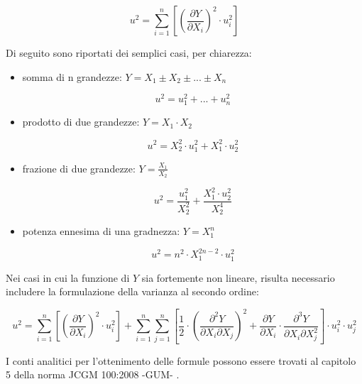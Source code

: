 \documentclass[a4paper, twoside]{article}
\begin{document}
\begin{equation}
    u^2 = \sum_{i=1}^{n} \left[ \left( \frac{\partial Y}{\partial X_i} \right)^2 \cdot u_i^2 \right]
\end{equation}

Di seguito sono riportati dei semplici casi, per chiarezza:

\begin{itemize}
    \item somma di n grandezze: $Y=X_1 \pm X_2 \pm ... \pm X_n$
     
        \begin{equation}
            u^2=u_1^2+...+u_n^2
        \end{equation}

    \item prodotto di due grandezze: $Y=X_1 \cdot X_2$
    
        \begin{equation}
            u^2=X_2^2 \cdot u_1^2+X_1^2 \cdot u_2^2
        \end{equation}

    \item frazione di due grandezze: $Y=\frac{X_1}{X_2}$
    
        \begin{equation}
            u^2=\frac{u_1^2}{X_2^2}+\frac{X_1^2 \cdot u_2^2}{X_2^4}
        \end{equation}

    \item potenza ennesima di una gradnezza: $Y=X_1^n$
    
        \begin{equation}
            u^2=n^2 \cdot X_1^{2n-2} \cdot u_1^2
        \end{equation}
\end{itemize}

Nei casi in cui la funzione di $Y$ sia fortemente non lineare, risulta necessario includere la formulazione della varianza al secondo ordine:

\begin{equation}
    u^2=\sum_{i=1}^{n} \left[ \left( \frac{\partial Y}{\partial X_i} \right)^2 \cdot u_i^2 \right]+\sum_{i=1}^{n} \sum_{j=1}^{n} \left[ \frac{1}{2} \cdot \left( \frac{\partial^2 Y}{\partial X_i \partial X_j} \right)^2 + \frac{\partial Y}{\partial X_i} \cdot \frac{\partial^3 Y}{\partial X_i \partial X_j^2} \right] \cdot u^2_i \cdot u^2_j
\end{equation}

I conti analitici per l'ottenimento delle formule
possono essere trovati al capitolo 5 della norma JCGM 100:2008 -GUM- \cite{GUM}.

    \newpage


\printbibliography


\end{document}
